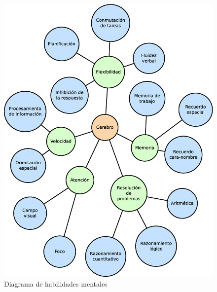 \begin{figure}[h]
  \begin{center}
    \includegraphics[width=\textwidth]{images/games-diagram-esp.eps}
    \caption{Diagrama de habilidades mentales}
    \label{fig::habilidades}
  \end{center}
\end{figure}

